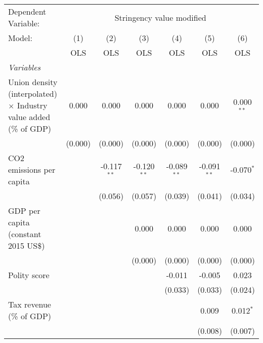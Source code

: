 
\begingroup
\centering
\begin{tabular}{lcccccc}
   \toprule
   Dependent Variable: & \multicolumn{6}{c}{Stringency value modified}\\
   Model:                                                                   & (1)     & (2)           & (3)           & (4)           & (5)           & (6)\\  
                                                                            &  OLS    & OLS           & OLS           & OLS           & OLS           & OLS\\  
   \midrule
   \emph{Variables}\\
   Union density (interpolated) $\times$ Industry value added (\% of GDP)   & 0.000   & 0.000         & 0.000         & 0.000         & 0.000         & 0.000$^{**}$\\   
                                                                            & (0.000) & (0.000)       & (0.000)       & (0.000)       & (0.000)       & (0.000)\\   
   CO2 emissions per capita                                                 &         & -0.117$^{**}$ & -0.120$^{**}$ & -0.089$^{**}$ & -0.091$^{**}$ & -0.070$^{*}$\\   
                                                                            &         & (0.056)       & (0.057)       & (0.039)       & (0.041)       & (0.034)\\   
   GDP per capita (constant 2015 US\$)                                      &         &               & 0.000         & 0.000         & 0.000         & 0.000\\   
                                                                            &         &               & (0.000)       & (0.000)       & (0.000)       & (0.000)\\   
   Polity score                                                             &         &               &               & -0.011        & -0.005        & 0.023\\   
                                                                            &         &               &               & (0.033)       & (0.033)       & (0.024)\\   
   Tax revenue (\% of GDP)                                                  &         &               &               &               & 0.009         & 0.012$^{*}$\\   
                                                                            &         &               &               &               & (0.008)       & (0.007)\\   

\end{tabular}
